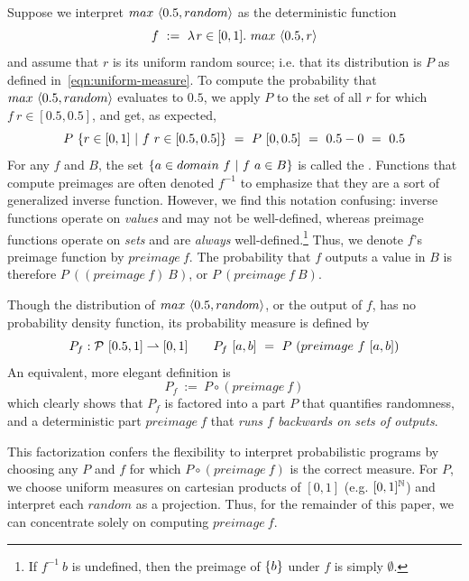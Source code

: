 \documentclass{llncs}
\newcommand{\pto}{\rightharpoonup}
\begin{document}
Suppose we interpret $max~\langle{0.5,random}\rangle$ as the deterministic function
\begin{equation}
	f\ :=\ \lambda\mspace{2mu}{r \in [0,1]}\ldotp\, max~\langle{0.5,r}\rangle
\label{eqn:max-random-manual-interp}
\end{equation}
and assume that $r$ is its uniform random source; i.e. that its distribution is $P$ as defined in~\eqref{eqn:uniform-measure}.
To compute the probability that $max~\langle{0.5,random}\rangle$ evaluates to $0.5$, we apply $P$ to the set of all $r$ for which $f~r \in [0.5,0.5]$, and get, as expected,
\begin{equation}
	P~\lbrace {r \in [0,1]} \ \lvert\ {f~r \in [0.5,0.5]} \rbrace\ =\ P~[0,0.5]\ =\ 0.5 - 0\ =\ 0.5
\end{equation}
For any $f$ and $B$, the set $\lbrace {a \in domain~f} \ \lvert\ {f~a \in B} \rbrace$ is called the .
Functions that compute preimages are often denoted $f^{-1}$ to emphasize that they are a sort of generalized inverse function.
However, we find this notation confusing: inverse functions operate on \emph{values} and may not be well-defined, whereas preimage functions operate on \emph{sets} and are \emph{always} well-defined.\footnote{If $f^{-1}~b$ is undefined, then the preimage of $\{{b}\}$ under $f$ is simply $\emptyset$.}\xspace
Thus, we denote $f$'s preimage function by $preimage~f$.
The probability that $f$ outputs a value in $B$ is therefore $P~((preimage~f)~B)$, or $P~(preimage~f~B)$.

Though the distribution of $max~\langle{0.5,random}\rangle$, or the output of $f$, has no probability density function, its probability measure is defined by
\begin{equation}
	P_f : \powerset~[0.5,1] \pto [0,1]\ \ \ \ \ \ P_f~[a,b]\ =\ P~(preimage~f~[a,b])
\end{equation}
An equivalent, more elegant definition is
\begin{equation}
	P_f\ :=\ P \circ (preimage~f)
\end{equation}
which clearly shows that $P_f$ is factored into a part $P$ that quantifies randomness, and a deterministic part $preimage~f$ that \emph{runs $f$ backwards on sets of outputs}.

This factorization confers the flexibility to interpret probabilistic programs by choosing any $P$ and $f$ for which $P \circ (preimage~f)$ is the correct measure.
For $P$, we choose uniform measures on cartesian products of $[0,1]$ (e.g. $[0,1]^{\mathbb{N}}$) and interpret each $random$ as a projection.
Thus, for the remainder of this paper, we can concentrate solely on computing $preimage~f$.
\end{document}
